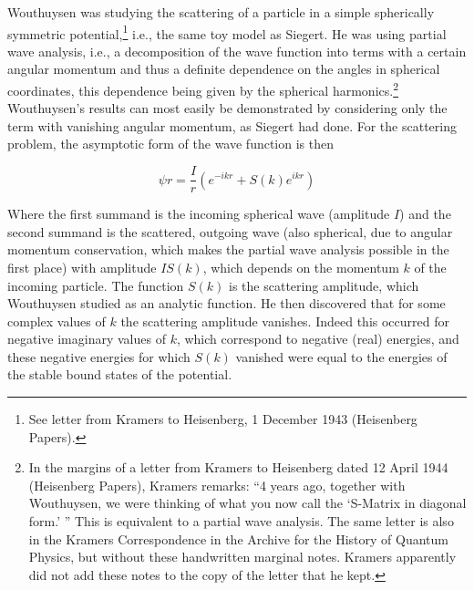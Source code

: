 \documentclass[12pt,a4paper]{article}
\begin{document}
Wouthuysen was studying the scattering of a particle in a simple spherically symmetric potential,\footnote{See letter from Kramers to Heisenberg, 1 December 1943 (Heisenberg Papers).} i.e., the same toy model as Siegert. He was using partial wave analysis, i.e., a decomposition of the wave function into terms with a certain angular momentum and thus a definite dependence on the angles in spherical coordinates, this dependence being given by the spherical harmonics.\footnote{In the margins of a letter from Kramers to Heisenberg dated 12 April 1944 (Heisenberg Papers), Kramers remarks: ``4 years ago, together with Wouthuysen, we were thinking of what you now call the `S-Matrix in diagonal form.' '' This is equivalent to a partial wave analysis. The same letter is also in the Kramers Correspondence in the Archive for the History of Quantum Physics, but without these handwritten marginal notes. Kramers apparently did not add these notes to the copy of the letter that he kept.} Wouthuysen's results can most easily be demonstrated by considering only the term with vanishing angular momentum, as Siegert had done. For the scattering problem, the asymptotic form of the wave function is then

\begin{equation}
\label{eq:asymptotic}
\psi{r} = \frac{I}{r} \left(e^{-ikr} + S (k) e^{ikr} \right)
 \end{equation}
 
Where the first summand is the incoming spherical wave (amplitude $I$) and the second summand is the scattered, outgoing wave (also spherical, due to angular momentum conservation, which makes the partial wave analysis possible in the first place) with amplitude $I S(k)$, which depends on the momentum $k$ of the incoming particle. The function $S(k)$ is the scattering amplitude, which Wouthuysen studied as an analytic function. He then discovered that for some complex values of $k$ the scattering amplitude vanishes. Indeed this occurred for negative imaginary values of $k$, which correspond to negative (real) energies, and these negative energies for which $S(k)$ vanished were equal to the energies of the stable bound states of the potential.
\end{document}
